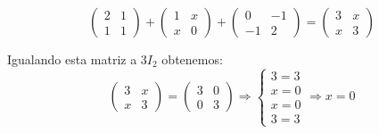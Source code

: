 \begin{ejemplo}
\begin{enumerate}[label=\alph*) ]
\[ 
\begin{pmatrix}
	2 & 1 \\
	1 & 1
\end{pmatrix} +  
\begin{pmatrix}
 	1 & x \\ 
 	x & 0
\end{pmatrix}
+\begin{pmatrix}
	0 & -1 \\
	-1 & 2
\end{pmatrix}=
\begin{pmatrix}
	3 & x \\
	x & 3
\end{pmatrix}
\]

Igualando esta matriz a $3I_2$ obtenemos:
\[
\begin{pmatrix}
	3 & x \\
	x & 3
\end{pmatrix}=
\begin{pmatrix}
	3 & 0 \\
	0 & 3
\end{pmatrix}
 \Rightarrow \left\lbrace
\begin{array}{l}
3=3 \\
x=0 \\
x=0 \\
3=3
\end{array}
\right. \Rightarrow x=0 \]

\end{enumerate}

\end{ejemplo}

